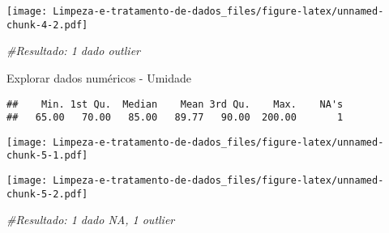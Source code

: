 \documentclass[
]{article}
\newenvironment{Shaded}{\begin{snugshade}}{\end{snugshade}}
\newcommand{\CommentTok}[1]{\textcolor[rgb]{0.56,0.35,0.01}{\textit{#1}}}
\newcommand{\FunctionTok}[1]{\textcolor[rgb]{0.00,0.00,0.00}{#1}}
\newcommand{\NormalTok}[1]{#1}
\newcommand{\SpecialCharTok}[1]{\textcolor[rgb]{0.00,0.00,0.00}{#1}}
\begin{document}
\begin{Shaded}
\end{Shaded}

\texttt{[image: Limpeza-e-tratamento-de-dados\_files/figure-latex/unnamed-chunk-4-2.pdf]}

\begin{Shaded}
\begin{Highlighting}[]
\CommentTok{\#Resultado: 1 dado outlier}
\end{Highlighting}
\end{Shaded}

Explorar dados numéricos - Umidade

\begin{Shaded}
\end{Shaded}

\begin{verbatim}
##    Min. 1st Qu.  Median    Mean 3rd Qu.    Max.    NA's 
##   65.00   70.00   85.00   89.77   90.00  200.00       1
\end{verbatim}

\begin{Shaded}
\end{Shaded}

\texttt{[image: Limpeza-e-tratamento-de-dados\_files/figure-latex/unnamed-chunk-5-1.pdf]}

\begin{Shaded}
\end{Shaded}

\texttt{[image: Limpeza-e-tratamento-de-dados\_files/figure-latex/unnamed-chunk-5-2.pdf]}

\begin{Shaded}
\begin{Highlighting}[]
\CommentTok{\#Resultado: 1 dado NA, 1 outlier}
\end{Highlighting}
\end{Shaded}
\end{document}
